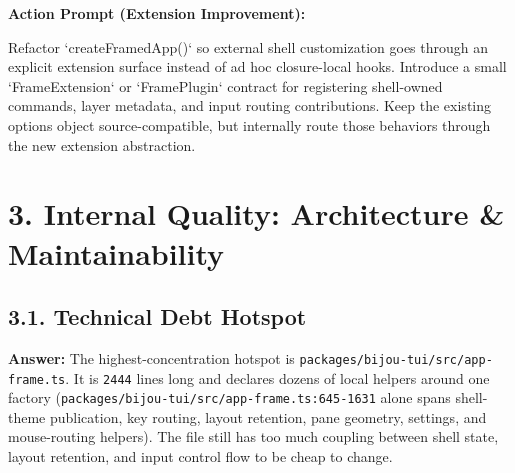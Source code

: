 \textbf{Action Prompt (Extension Improvement):}

\begin{CodeBlock}
Refactor `createFramedApp()` so external shell customization goes through an explicit extension surface instead of ad hoc closure-local hooks. Introduce a small `FrameExtension` or `FramePlugin` contract for registering shell-owned commands, layer metadata, and input routing contributions. Keep the existing options object source-compatible, but internally route those behaviors through the new extension abstraction.
\end{CodeBlock}

\section{3. Internal Quality: Architecture \& Maintainability}\label{record-416-internal-quality-architecture-maintainability}

\subsection{3.1. Technical Debt Hotspot}\label{record-416-technical-debt-hotspot}

\textbf{Answer:} The highest-concentration hotspot is \texttt{p\allowbreak{}a\allowbreak{}c\allowbreak{}k\allowbreak{}a\allowbreak{}g\allowbreak{}e\allowbreak{}s\allowbreak{}/\allowbreak{}b\allowbreak{}i\allowbreak{}j\allowbreak{}o\allowbreak{}u\allowbreak{}-\allowbreak{}t\allowbreak{}u\allowbreak{}i\allowbreak{}/\allowbreak{}s\allowbreak{}r\allowbreak{}c\allowbreak{}/\allowbreak{}a\allowbreak{}p\allowbreak{}p\allowbreak{}-\allowbreak{}f\allowbreak{}r\allowbreak{}a\allowbreak{}m\allowbreak{}e\allowbreak{}.\allowbreak{}t\allowbreak{}s}. It is \texttt{2\allowbreak{}4\allowbreak{}4\allowbreak{}4} lines long and declares dozens of local helpers around one factory (\texttt{p\allowbreak{}a\allowbreak{}c\allowbreak{}k\allowbreak{}a\allowbreak{}g\allowbreak{}e\allowbreak{}s\allowbreak{}/\allowbreak{}b\allowbreak{}i\allowbreak{}j\allowbreak{}o\allowbreak{}u\allowbreak{}-\allowbreak{}t\allowbreak{}u\allowbreak{}i\allowbreak{}/\allowbreak{}s\allowbreak{}r\allowbreak{}c\allowbreak{}/\allowbreak{}a\allowbreak{}p\allowbreak{}p\allowbreak{}-\allowbreak{}f\allowbreak{}r\allowbreak{}a\allowbreak{}m\allowbreak{}e\allowbreak{}.\allowbreak{}t\allowbreak{}s\allowbreak{}:\allowbreak{}6\allowbreak{}4\allowbreak{}5\allowbreak{}-\allowbreak{}1\allowbreak{}6\allowbreak{}3\allowbreak{}1} alone spans shell-theme publication, key routing, layout retention, pane geometry, settings, and mouse-routing helpers). The file still has too much coupling between shell state, layout retention, and input control flow to be cheap to change.

